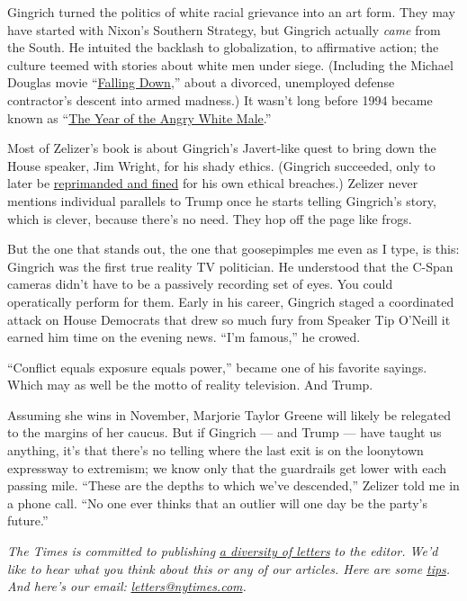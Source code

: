 Gingrich turned the politics of white racial grievance into an art form.
They may have started with Nixon's Southern Strategy, but Gingrich
actually \emph{came} from the South. He intuited the backlash to
globalization, to affirmative action; the culture teemed with stories
about white men under siege. (Including the Michael Douglas movie
``\href{https://www.nytimes.com/1993/02/26/movies/review-film-urban-horrors-all-too-familiar.html}{Falling
Down},'' about a divorced, unemployed defense contractor's descent into
armed madness.) It wasn't long before 1994 became known as
``\href{http://ks/edition/Breaking_the_Political_Glass_Ceiling/XnHB9eQJKrkC}{The
Year of the Angry White Male}.''

Most of Zelizer's book is about Gingrich's Javert-like quest to bring
down the House speaker, Jim Wright, for his shady ethics. (Gingrich
succeeded, only to later be
\href{https://archive.nytimes.com/www.nytimes.com/library/politics/0122gingrich-ethics.html}{reprimanded
and fined} for his own ethical breaches.) Zelizer never mentions
individual parallels to Trump once he starts telling Gingrich's story,
which is clever, because there's no need. They hop off the page like
frogs.

But the one that stands out, the one that goosepimples me even as I
type, is this: Gingrich was the first true reality TV politician. He
understood that the C-Span cameras didn't have to be a passively
recording set of eyes. You could operatically perform for them. Early in
his career, Gingrich staged a coordinated attack on House Democrats that
drew so much fury from Speaker Tip O'Neill it earned him time on the
evening news. ``I'm famous,'' he crowed.

``Conflict equals exposure equals power,'' became one of his favorite
sayings. Which may as well be the motto of reality television. And
Trump.

Assuming she wins in November, Marjorie Taylor Greene will likely be
relegated to the margins of her caucus. But if Gingrich --- and Trump
--- have taught us anything, it's that there's no telling where the last
exit is on the loonytown expressway to extremism; we know only that the
guardrails get lower with each passing mile. ``These are the depths to
which we've descended,'' Zelizer told me in a phone call. ``No one ever
thinks that an outlier will one day be the party's future.''

\emph{The Times is committed to publishing}
\href{https://www.nytimes.com/2019/01/31/opinion/letters/letters-to-editor-new-york-times-women.html}{\emph{a
diversity of letters}} \emph{to the editor. We'd like to hear what you
think about this or any of our articles. Here are some}
\href{https://help.nytimes.com/hc/en-us/articles/115014925288-How-to-submit-a-letter-to-the-editor}{\emph{tips}}\emph{.
And here's our email:}
\href{mailto:letters@nytimes.com}{\emph{letters@nytimes.com}}\emph{.}


